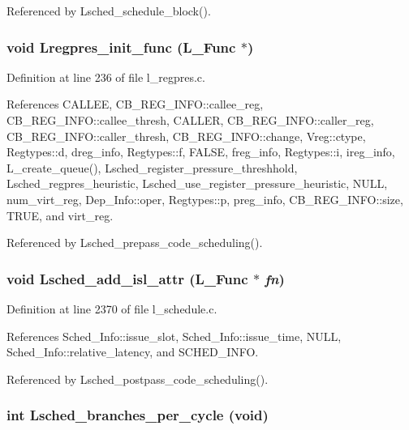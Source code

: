 Referenced by Lsched\_\-schedule\_\-block().
\subsubsection{\setlength{\rightskip}{0pt plus 5cm}void Lregpres\_\-init\_\-func (L\_\-Func $\ast$)}\label{l__schedule_8h_526d3b7e511047a384d3d76acca48803}




Definition at line 236 of file l\_\-regpres.c.

References CALLEE, CB\_\-REG\_\-INFO::callee\_\-reg, CB\_\-REG\_\-INFO::callee\_\-thresh, CALLER, CB\_\-REG\_\-INFO::caller\_\-reg, CB\_\-REG\_\-INFO::caller\_\-thresh, CB\_\-REG\_\-INFO::change, Vreg::ctype, Regtypes::d, dreg\_\-info, Regtypes::f, FALSE, freg\_\-info, Regtypes::i, ireg\_\-info, L\_\-create\_\-queue(), Lsched\_\-register\_\-pressure\_\-threshhold, Lsched\_\-regpres\_\-heuristic, Lsched\_\-use\_\-register\_\-pressure\_\-heuristic, NULL, num\_\-virt\_\-reg, Dep\_\-Info::oper, Regtypes::p, preg\_\-info, CB\_\-REG\_\-INFO::size, TRUE, and virt\_\-reg.

Referenced by Lsched\_\-prepass\_\-code\_\-scheduling().
\subsubsection{\setlength{\rightskip}{0pt plus 5cm}void Lsched\_\-add\_\-isl\_\-attr (L\_\-Func $\ast$ {\em fn})}\label{l__schedule_8h_1882c164271a9d0021a970f2735de0b0}




Definition at line 2370 of file l\_\-schedule.c.

References Sched\_\-Info::issue\_\-slot, Sched\_\-Info::issue\_\-time, NULL, Sched\_\-Info::relative\_\-latency, and SCHED\_\-INFO.

Referenced by Lsched\_\-postpass\_\-code\_\-scheduling().
\subsubsection{\setlength{\rightskip}{0pt plus 5cm}int Lsched\_\-branches\_\-per\_\-cycle (void)}\label{l__schedule_8h_ff965250ced17845e2f5165e881e5776}




